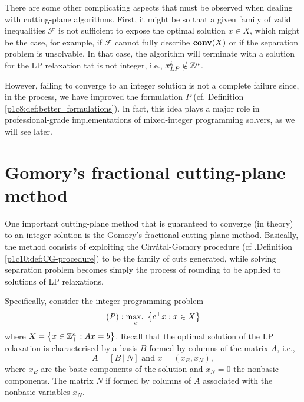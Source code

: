 There are some other complicating aspects that must be observed when dealing with cutting-plane algorithms. First, it might be so that a given family of valid inequalities $\mathcal{F}$ is not sufficient to expose the optimal solution $x \in X$, which might be the case, for example, if $\mathcal{F}$ cannot fully describe $\mathop{\bf conv}(X)$ or if the separation problem is unsolvable. In that case, the algorithm will terminate with a solution for the LP relaxation tat is not integer, i.e., $x_{LP}^k \notin \mathbb{Z}^n$. 

However, failing to converge to an integer solution is not a complete failure since, in the process, we have improved the formulation $P$ (cf. Definition \ref{p1c8:def:better_formulations}). In fact, this idea plays a major role in professional-grade implementations of mixed-integer programming solvers, as we will see later. 


\section{Gomory's fractional cutting-plane method}

One important cutting-plane method that is guaranteed to converge (in theory) to an integer solution is the Gomory's fractional cutting plane method. Basically, the method consists of exploiting the Chv\'atal-Gomory procedure (cf .Definition \ref{p1c10:def:CG-procedure}) to be the family of cuts generated, while solving separation problem becomes simply the process of rounding to be applied to solutions of LP relaxations. 

Specifically, consider the integer programming problem 
%
\begin{equation*}
	(P): \mathop{\text{max.~}}_x\left\{ c^\top x : x \in X \right \}
\end{equation*}
%
where $X = \left\{ x \in \mathbb{Z}^n_+ : Ax = b \right \}$. Recall that the optimal solution of the LP relaxation is characterised by a basis $B$ formed by columns of the matrix $A$, i.e.,
%
\begin{equation*}
	A = [B ~|~ N] \text{ and } x = (x_B, x_N),	
\end{equation*}
%
where $x_B$ are the basic components of the solution and $x_N = 0$ the nonbasic components. The matrix $N$ if formed by columns of $A$ associated with the nonbasic variables $x_N$.

